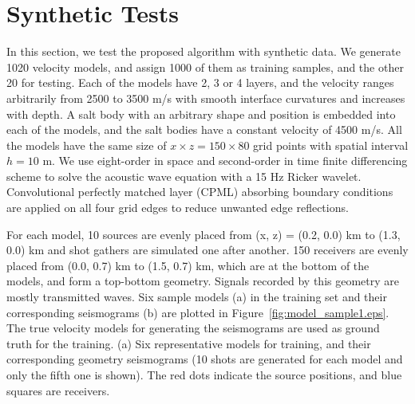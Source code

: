 \documentclass{segabs}
\begin{document}


\section{Synthetic Tests}
In this section, we test the proposed algorithm with synthetic data. 
We generate 1020 velocity models, and assign 1000 of them as training samples, and the other 20 for testing. Each of the models have 2, 3 or 4 layers, and the velocity ranges arbitrarily from 2500 to 3500 m/s with smooth interface curvatures and increases with depth. 
A salt body with an arbitrary shape and position is embedded into each of the models, and the salt bodies have a constant velocity of 4500 m/s. 
 All the models have the same size of $x\times z = 150 \times 80$ grid points with spatial interval $h=10$ m. 
We use eight-order in space and second-order in time finite differencing scheme to solve the acoustic wave equation with a 15 Hz Ricker wavelet.
Convolutional perfectly matched layer (CPML) absorbing boundary conditions \citep{komatitsch07} are applied on all four grid edges to reduce unwanted edge reflections.

For each model, 10 sources are evenly placed from (x, z) = (0.2, 0.0) km to (1.3, 0.0) km and shot gathers are simulated one after another. 
150 receivers are evenly placed from (0.0, 0.7) km to (1.5, 0.7) km, which are at the bottom of the models, and form a top-bottom geometry. Signals recorded by this geometry are mostly transmitted waves. Six sample models (a) in the training set and their corresponding seismograms (b) are plotted in Figure~\ref{fig:model_sample1.eps}. The true velocity models for generating the seismograms are used as ground truth for the training. 
{(a) Six representative models for training, and their corresponding geometry seismograms (10 shots are generated for each model and only the fifth one is shown). The red dots indicate the source positions, and blue squares are receivers.}
\end{document}
